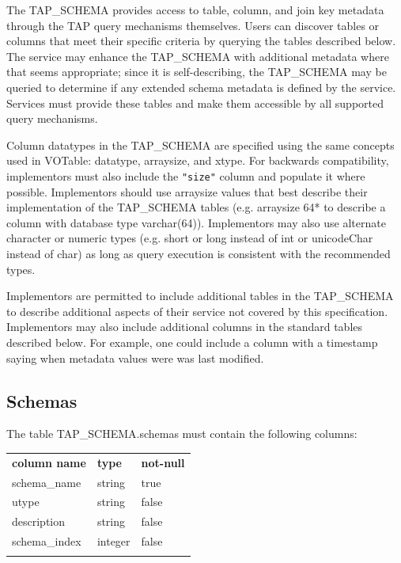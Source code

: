 \documentclass[11pt,letter]{ivoa}
\newcommand{\tapschema}{TAP\_SCHEMA}
\newcommand{\tapschema}{\mbox{%
  \relsize{-0.5}TAP\discretionary{-}{}{\kern-2pt\_}SCHEMA}}
\begin{document}
The \tapschema{} provides access to table, column, and join key 
metadata through the TAP query mechanisms themselves. Users can discover tables 
or columns that meet their specific criteria by querying the tables described 
below.  The service may enhance the \tapschema{} with additional 
metadata where that seems appropriate; since it is self-describing, the 
\tapschema{} may be queried to determine if any extended schema 
metadata is defined by the service. Services must provide these tables and make 
them accessible by all supported query mechanisms.

Column datatypes in the \tapschema{} are specified using the same concepts used in 
VOTable: datatype, arraysize, and xtype. For backwards compatibility, implementors
must also include the \verb|"size"| column and populate it where possible. 
Implementors should use arraysize values
that best describe their implementation of the \tapschema{} tables (e.g. arraysize 64* to describe
a column with database type varchar(64)). Implementors may also use alternate character or numeric types (e.g. short or long instead of int or unicodeChar instead of char) as long as
query execution is consistent with the recommended types.

Implementors are permitted to include additional tables in the 
\tapschema{} to describe additional aspects of their service not 
covered by this specification. Implementors may also include additional columns 
in the standard tables described below. For example, one could include a column 
with a timestamp saying when metadata values were was last modified.

\subsection{Schemas}
\label{sec:tap-schema-schemas}

The table \tapschema.schemas must contain the following columns:

\begin{inlinetable}
\begin{tabular}{l l l}
\sptablerule
\textbf{column name} & \textbf{type} & \textbf{not-null} \\
\sptablerule
schema\_name & string & true \\
utype & string & false \\
description & string & false \\
schema\_index & integer & false \\
\sptablerule
\end{tabular}
\end{inlinetable}
\end{document}
